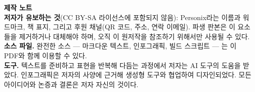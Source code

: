 \clearpage
\thispagestyle{empty}
\begin{flushleft}\small\sffamily
\textbf{제작 노트}\\[1.2em]

\textbf{저자가 유보하는 것}(CC BY-SA 라이선스에 포함되지 않음): Personix라는
이름과 워드마크, 책 표지, 그리고 후원 채널(QR 코드, 주소, 연락 이메일).
파생 판본은 이 요소들을 제거하거나 대체해야 하며, 오직 이 원저작을 참조하기
위해서만 사용될 수 있다.\\[1.2em]

\textbf{소스 파일.} 완전한 소스 --- 마크다운 텍스트, 인포그래픽, 빌드
스크립트 --- 는 이 PDF와 함께 이용할 수 있다.\\[1.2em]

\textbf{도구.} 텍스트를 준비하고 표현을 반복해 다듬는 과정에서 저자는 AI
도구의 도움을 받았다. 인포그래픽은 저자의 사양에 근거해 생성형 도구와
협업하여 디자인되었다. 모든 아이디어와 논증과 결론은 저자 자신의 것이다.
\end{flushleft}
\clearpage
